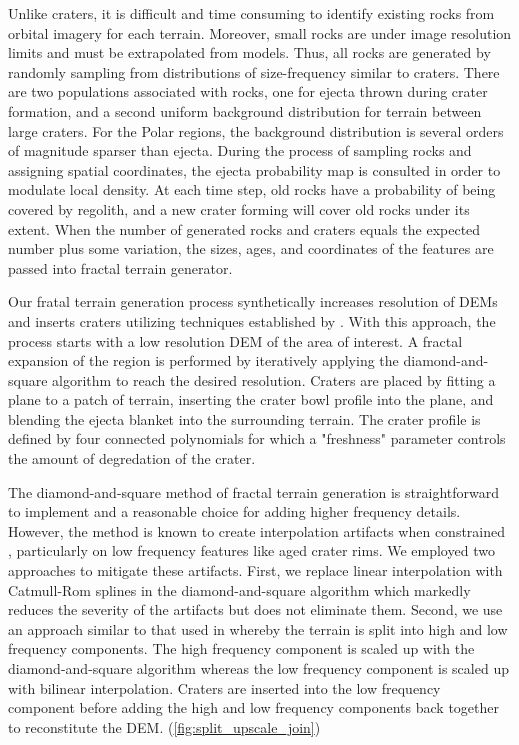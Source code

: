 \documentclass[twocolumn,letterpaper]{IEEEAerospaceCLS}  %
\begin{document}
Unlike craters, it is difficult and time consuming to identify existing rocks from orbital imagery for each terrain. 
Moreover, small rocks are under image resolution limits and must be extrapolated from models. 
Thus, all rocks are generated by randomly sampling from distributions of size-frequency similar to craters. 
There are two populations associated with rocks, one for ejecta thrown during crater formation, and a second uniform background distribution for terrain between large craters. 
For the Polar regions, the background distribution is several orders of magnitude sparser than ejecta. 
During the process of sampling rocks and assigning spatial coordinates, the ejecta probability map is consulted in order to modulate local density. 
At each time step, old rocks have a probability of being covered by regolith, and a new crater forming will cover old rocks under its extent. 
When the number of generated rocks and craters equals the expected number plus some variation, the sizes, ages, and coordinates of the features are passed into fractal terrain generator.     

Our fratal terrain generation process synthetically increases resolution of DEMs and inserts craters utilizing techniques established by \cite{parkes2004planet}. 
With this approach, the process starts with a low resolution DEM of the area of interest.
A fractal expansion of the region is performed by iteratively applying the diamond-and-square algorithm to reach the desired resolution. 
Craters are placed by fitting a plane to a patch of terrain, inserting the crater bowl profile into the plane, and blending the ejecta blanket into the surrounding terrain. 
The crater profile is defined by four connected polynomials for which a "freshness" parameter controls the amount of degredation of the crater. 

The diamond-and-square method of fractal terrain generation is straightforward to implement and a reasonable choice for adding higher frequency details. 
However, the method is known to create interpolation artifacts when constrained \cite{miller1986definition}, particularly on low frequency features like aged crater rims. 
We employed two approaches to mitigate these artifacts. 
First, we replace linear interpolation with Catmull-Rom splines in the diamond-and-square algorithm which markedly reduces the severity of the artifacts but does not eliminate them.
Second, we use an approach similar to that used in \cite{shankar2008lunar} whereby the terrain is split into high and low frequency components.
The high frequency component is scaled up with the diamond-and-square algorithm whereas the low frequency component is scaled up with bilinear interpolation. 
Craters are inserted into the low frequency component before adding the high and low frequency components back together to reconstitute the DEM. (\cref{fig:split_upscale_join})
\end{document}
